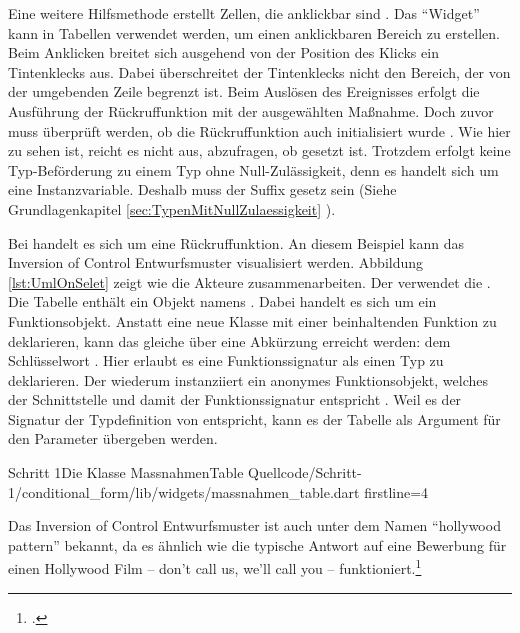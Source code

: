 Eine weitere Hilfsmethode  erstellt Zellen, die anklickbar sind .
Das \enquote{Widget}   kann in Tabellen verwendet werden, um einen anklickbaren Bereich zu erstellen.
Beim  Anklicken breitet sich ausgehend von der Position des Klicks ein Tintenklecks  aus.
Dabei überschreitet der Tintenklecks nicht den Bereich, der von der umgebenden Zeile begrenzt ist.
Beim Auslösen des Ereignisses  erfolgt die Ausführung der Rückruffunktion   mit der ausgewählten Maßnahme.
Doch zuvor muss überprüft werden,
ob die Rückruffunktion auch initialisiert wurde .
Wie hier zu sehen ist, reicht es nicht aus, abzufragen, ob   gesetzt ist.
Trotzdem erfolgt keine Typ-Beförderung zu einem Typ ohne Null-Zulässigkeit, denn es handelt sich um eine Instanzvariable.
Deshalb muss der Suffix \IC{!} gesetz sein (Siehe Grundlagenkapitel \ref{sec:TypenMitNullZulaessigkeit} ).

Bei  handelt es sich um eine Rückruffunktion.
An diesem Beispiel kann das Inversion of Control Entwurfsmuster visualisiert werden.
Abbildung \ref{lst:UmlOnSelet} zeigt wie die Akteure zusammenarbeiten.
Der  verwendet die .
Die Tabelle enthält ein Objekt namens .
Dabei handelt es sich um ein Funktionsobjekt.
Anstatt eine neue Klasse mit einer beinhaltenden Funktion zu deklarieren, kann das gleiche über eine Abkürzung erreicht werden: dem Schlüsselwort  .
Hier erlaubt es eine Funktionssignatur als einen Typ zu deklarieren.
Der  wiederum instanziiert ein anonymes Funktionsobjekt, welches der Schnittstelle und damit der Funktionssignatur entspricht .
Weil es der Signatur der Typdefinition von   entspricht, kann es der Tabelle als Argument für den Parameter  übergeben werden. 

\begin{alexlisting}{Schritt 1}{Die Klasse MassnahmenTable}
  {Quellcode/Schritt-1/conditional_form/lib/widgets/massnahmen_table.dart}
  {firstline=4}
  \label{lst:Schritt1KlasseMassnahmenTable}
\end{alexlisting}



Das Inversion of Control Entwurfsmuster ist auch unter dem Namen \enquote{hollywood pattern} bekannt, da es ähnlich wie die typische Antwort auf eine Bewerbung für einen Hollywood Film -- don’t call us, we’ll call you -- funktioniert.\footcite[Vgl.][]{fowler2005InversionOfControl}

